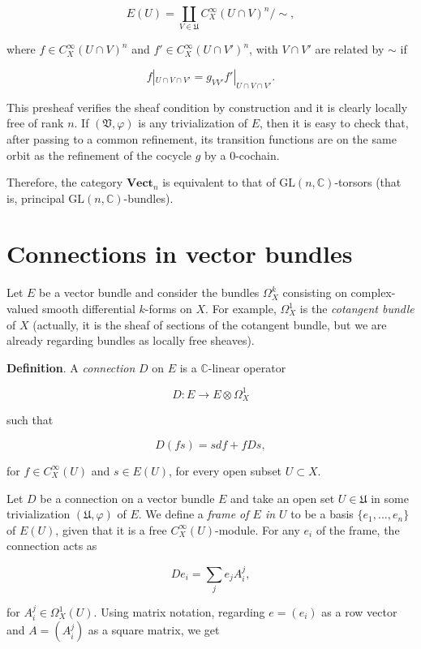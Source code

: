 \documentclass[]{article}
\begin{document}
\[
E(U)= \coprod_{V \in \mathfrak{U}} C^\infty_X(U\cap V)^n / \sim,
\]

where \(f \in C^\infty_X(U\cap V)^n\) and
\(f' \in C^\infty_X(U\cap V')^n\), with \(V\cap V'\) are related by
\(\sim\) if

\[
f|_{U\cap V \cap V'} = g_{V V'} f'|_{U\cap V \cap V'}.
\]

This presheaf verifies the sheaf condition by construction and it is
clearly locally free of rank \(n\). If \((\mathfrak{V},\varphi)\) is any
trivialization of \(E\), then it is easy to check that, after passing to
a common refinement, its transition functions are on the same orbit as
the refinement of the cocycle \(g\) by a \(0\)-cochain.

Therefore, the category \(\mathbf{Vect}_n\) is equivalent to that of
\(\mathrm{GL}(n,\mathbb{C})\)-torsors (that is, principal
\(\mathrm{GL}(n,\mathbb{C})\)-bundles).

\section{Connections in vector
bundles}\label{connections-in-vector-bundles}

Let \(E\) be a vector bundle and consider the bundles \(\Omega^k_X\)
consisting on complex-valued smooth differential \(k\)-forms on \(X\).
For example, \(\Omega^1_X\) is the \emph{cotangent bundle} of \(X\)
(actually, it is the sheaf of sections of the cotangent bundle, but we
are already regarding bundles as locally free sheaves).

\textbf{Definition}. A \emph{connection} \(D\) on \(E\) is a
\(\mathbb{C}\)-linear operator

\[
D: E \rightarrow E \otimes \Omega^1_X
\]

such that

\[
D(fs) = sdf + f Ds,
\]

for \(f\in C^\infty_X(U)\) and \(s\in E(U)\), for every open subset
\(U\subset X\).

Let \(D\) be a connection on a vector bundle \(E\) and take an open set
\(U\in \mathfrak{U}\) in some trivialization \((\mathfrak{U},\varphi)\)
of \(E\). We define a \emph{frame of \(E\) in \(U\)} to be a basis
\(\{e_1,...,e_n\}\) of \(E(U)\), given that it is a free
\(C^\infty_X(U)\)-module. For any \(e_i\) of the frame, the connection
acts as

\[
D e_i = \sum_j e_j A^j_i,
\]

for \(A^j_i \in \Omega^1_X(U)\). Using matrix notation, regarding
\(e=(e_i)\) as a row vector and \(A=(A^j_i)\) as a square matrix, we get
\end{document}
